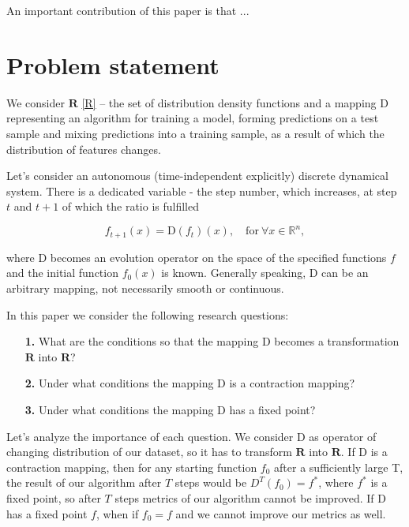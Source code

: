 \documentclass{article}
\begin{document}
    An important contribution of this paper is that ...

\section{Problem statement} \label{Problem_statement}

    We consider $\mathbf{R}$ \eqref{R} -- the set of distribution density functions and a mapping $\text{D}$ representing an algorithm for training a model, forming predictions on a test sample and mixing predictions into a training sample, as a result of which the distribution of features changes.

    Let's consider an autonomous (time-independent explicitly) discrete dynamical system. There is a dedicated variable - the step number, which increases, at step $t$ and $t+1$ of which the ratio is fulfilled

    \begin{equation*}
        f_{t+1}(x) = \text{D}(f_t)(x), \quad \text{for}~ \forall x \in \mathbb{R}^n,
    \end{equation*}

    where $\text{D}$ becomes an evolution operator on the space of the specified functions $f$ and the initial function $f_0(x)$ is known. Generally speaking, $\text{D}$ can be an arbitrary mapping, not necessarily smooth or continuous.

    In this paper we consider the following research questions:

    \begin{enumerate}
        \item[\textbf{1.}]  What are the conditions so that the mapping $\text{D}$ becomes a transformation $\mathbf{R}$ into $\mathbf{R}$? 

        \item[\textbf{2.}] Under what conditions the mapping $\text{D}$ is a contraction mapping?

        \item[\textbf{3.}] Under what conditions the mapping $\text{D}$ has a fixed point?
    \end{enumerate}

    Let's analyze the importance of each question. We consider $\text{D}$ as operator of changing distribution of our dataset, so it has to transform $\mathbf{R}$ into $\mathbf{R}$. If $\text{D}$ is a contraction mapping, then for any starting function $f_0$ after a sufficiently large T, the result of our algorithm after $T$ steps would be $D^T(f_0) = f^*$, where $f^*$ is a fixed point, so after $T$ steps metrics of our algorithm cannot be improved. If $\text{D}$ has a fixed point $f$, when if $f_0 = f$ and we cannot improve our metrics as well.
\end{document}
